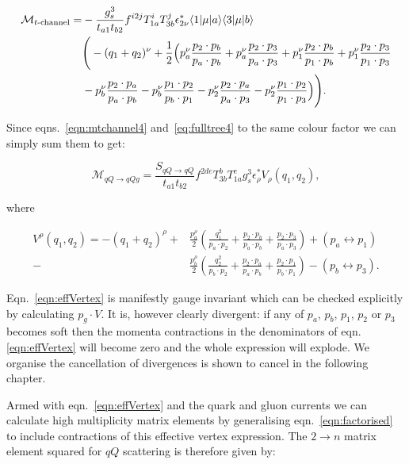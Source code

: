 		\begin{align}
		\begin{split}
			\mathcal{M}_{t\text{-channel}} = &-\frac{g_s^3}{t_{a1}t_{b2}}f^{i2j}T^i_{1a}T^j_{3b} \epsilon^*_{2\nu}
			\langle 1 | \mu | a \rangle\langle 3 | \mu | b \rangle\\
			&\Bigg(-(q_1 + q_2)^\nu + \frac{1}{2}\Big(
			p_a^\nu \frac{p_2\cdot p_b}{p_a\cdot p_b} + p_a^\nu \frac{p_2\cdot p_3}{p_a\cdot p_3} +
			p_1^\nu \frac{p_2\cdot p_b}{p_1\cdot p_b} + p_1^\nu \frac{p_2\cdot p_3}{p_1\cdot p_3}  \\
		       &-p_b^\nu \frac{p_2\cdot p_a}{p_a\cdot p_b} - p_b^\nu \frac{p_1\cdot p_2}{p_b\cdot p_1} -
			p_2^\nu \frac{p_2\cdot p_a}{p_a\cdot p_3} - p_2^\nu \frac{p_1\cdot p_2}{p_1\cdot p_3}
			\Big)
			\Bigg).
			\label{eqn:mtchannel4}
		\end{split}
		\end{align}

		Since eqns.~\eqref{eqn:mtchannel4} and~\eqref{eq:fulltree4} to the same colour factor we can simply sum
		them to get:

		\begin{equation}
			\mathcal{M}_{qQ\rightarrow qQg} = \frac{S_{qQ\rightarrow qQ}}{t_{a1}t_{b2}}
			f^{2de}T^b_{3b}T^e_{1a}g_s^3\epsilon^*_\rho V_\rho(q_1, q_2),
		\end{equation}

		where

		\begin{align}
			V^\rho(q_1, q_2) = -(q_1 + q_2)^\rho +
			&\frac{p_a^\rho}{2}\left(\frac{q^2_1}{p_a\cdot p_2} + \frac{p_2 \cdot p_b}{p_a \cdot p_b} +
			\frac{p_2 \cdot p_3}{p_a \cdot p_3}\right) + (p_a\leftrightarrow p_1) \\
			- &\frac{p_b^\rho}{2}\left(\frac{q^2_2}{p_b\cdot p_2} + \frac{p_2 \cdot p_a}{p_a \cdot p_b} +
			\frac{p_2 \cdot p_1}{p_b \cdot p_1}\right) - (p_b\leftrightarrow p_3).
			\label{eqn:effVertex}
		\end{align}

		Eqn.~\eqref{eqn:effVertex} is manifestly gauge invariant which can be checked explicitly by
		calculating $p_g\cdot V$.  It is, however clearly divergent:  if any of $p_a$, $p_b$, $p_1$,
		$p_2$ or $p_3$ becomes soft then the momenta contractions in the denominators of eqn.
		\eqref{eqn:effVertex} will become zero and the whole expression will explode.  We organise
		the cancellation of divergences is shown to cancel in the following chapter.

		Armed with eqn.~\eqref{eqn:effVertex} and the quark and gluon currents we can calculate
		high multiplicity matrix elements by generalising eqn.~\eqref{eqn:factorised} to include
		contractions of this effective vertex expression.  The $2\rightarrow n$ matrix element
		squared for $qQ$ scattering is therefore given by:

